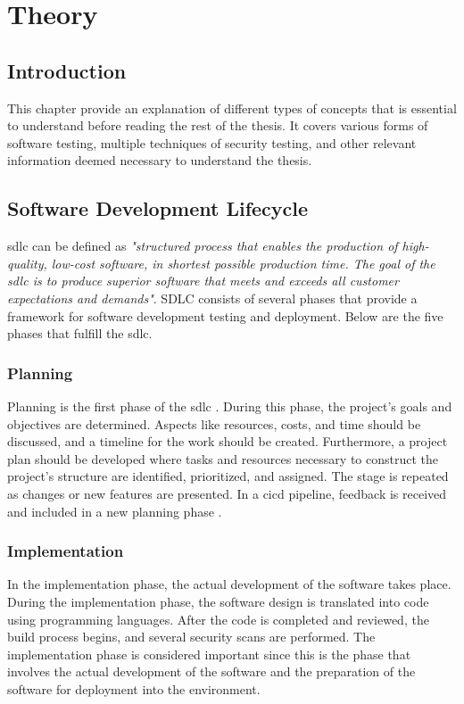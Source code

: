 \chapter{Theory}
\label{chap:Theory}

\section{Introduction}
This chapter provide an explanation of different types of concepts that is essential to understand before reading the rest of the thesis. It covers various forms of software testing, multiple techniques of security testing, and other relevant information deemed necessary to understand the thesis.

\section{Software Development Lifecycle}
\acrlong{sdlc} can be defined as \textit{"structured process that enables the production of high-quality, low-cost software, in shortest possible production time. The goal of the \acrshort{sdlc} is to produce superior software that meets and exceeds all customer expectations and demands"}\cite{sdlc1}.  SDLC consists of several phases that provide a framework for software development testing and deployment. Below are the five phases that fulfill the \acrshort{sdlc}. 

\subsection{Planning} 
Planning is the first phase of the \acrshort{sdlc} \cite{planningphase}. During this phase, the project's goals and objectives are determined. Aspects like resources, costs, and time should be discussed, and a timeline for the work should be created.  Furthermore, a project plan should be developed where tasks and resources necessary to construct the project's structure are identified, prioritized, and assigned. The stage is repeated as changes or new features are presented. In a \acrshort{cicd} pipeline, feedback is received and included in a new planning phase \cite{PlanningPhaseRepeat}.

\subsection{Implementation}
In the implementation phase, the actual development of the software takes place. During the implementation phase, the software design is translated into code using programming languages. After the code is completed and reviewed, the build process begins, and several security scans are performed.
The implementation phase is considered important since this is the phase that involves the actual development of the software and the preparation of the software for deployment into the environment.  \cite{ImplementationSDLC}
 
